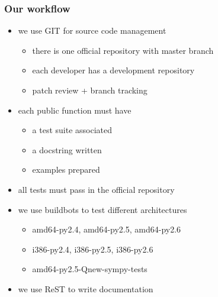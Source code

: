 \documentclass{beamer}
\begin{document}
\begin{frame}[fragile]
    \frametitle{Our workflow}

    \begin{itemize}
        \item we use GIT for source code management
            \begin{itemize}
                \item there is one official repository with master branch
                \item each developer has a development repository
                \item patch review + branch tracking
            \end{itemize}
        \item each public function must have
        \begin{itemize}
            \item a test suite associated
            \item a docstring written
            \item examples prepared
        \end{itemize}
        \item all tests must pass in the official repository
        \item we use buildbots to test different architectures
        \begin{itemize}
            \item amd64-py2.4, amd64-py2.5, amd64-py2.6
            \item i386-py2.4, i386-py2.5, i386-py2.6
            \item amd64-py2.5-Qnew-sympy-tests
        \end{itemize}
        \item we use ReST to write documentation
    \end{itemize}
\end{frame}
\end{document}
